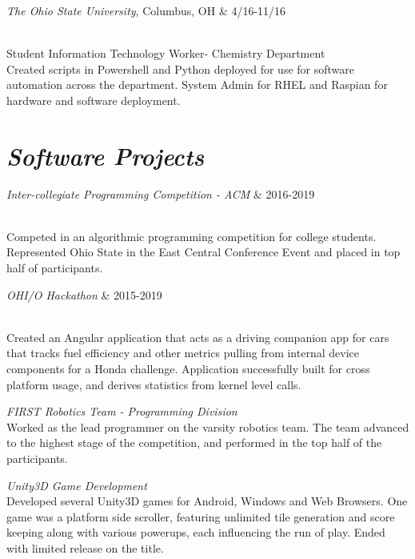 \documentclass[]{res}
\begin{document}
{			
			\begin{ncolumn}{2} 
			{\it The Ohio State University}, Columbus, OH & \hfill  4/16-11/16 
			\end{ncolumn}\\
			Student Information Technology Worker- Chemistry Department \\
			Created scripts in Powershell and Python deployed for use for software automation across the department. System Admin for RHEL and Raspian for hardware and software deployment.
			

			\section{\sl  \textbf{Software Projects}}
			\begin{ncolumn}{2} 
			\textit{Inter-collegiate Programming Competition - ACM} & \hfill  2016-2019 
			\end{ncolumn}\\
			Competed in an algorithmic programming competition for college students. Represented Ohio State in the East Central Conference Event and placed in top half of participants.
			
			\begin{ncolumn}{2} 
			\textit{OHI/O Hackathon} & \hfill  2015-2019 
			\end{ncolumn}\\
			Created an Angular application that acts as a driving companion app for cars that tracks fuel efficiency and other metrics pulling from internal device components for a Honda challenge. Application successfully built for cross platform usage, and derives statistics from kernel level calls.
			
			\textit{FIRST Robotics Team - Programming Division}\\
			Worked as the lead programmer on the varsity robotics team. The team advanced to the highest stage of the competition, and performed in the top half of the participants.
			
			\textit{Unity3D Game Development}\\
			Developed several Unity3D games for Android, Windows and Web Browsers. One game was a platform side scroller, featuring unlimited tile generation and score keeping along with various powerups, each influencing the run of play. Ended with limited release on the title.
			
}
\end{document}
